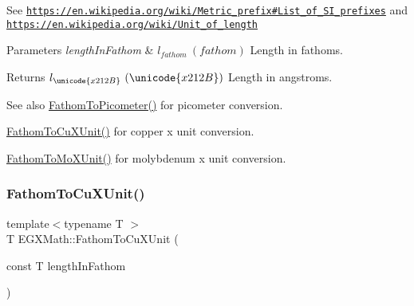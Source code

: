 See \href{https://en.wikipedia.org/wiki/Metric_prefix#List_of_SI_prefixes}{\tt https\+://en.\+wikipedia.\+org/wiki/\+Metric\+\_\+prefix\#\+List\+\_\+of\+\_\+\+S\+I\+\_\+prefixes} and \href{https://en.wikipedia.org/wiki/Unit_of_length}{\tt https\+://en.\+wikipedia.\+org/wiki/\+Unit\+\_\+of\+\_\+length} 
\begin{DoxyParams}{Parameters}
{\em length\+In\+Fathom} & $ l_{fathom}\ (fathom)$ Length in fathoms. \\
\hline
\end{DoxyParams}
\begin{DoxyReturn}{Returns}
$ l_{\unicode{x212B}}\ (\unicode{x212B})$ Length in angstroms. 
\end{DoxyReturn}
\begin{DoxySeeAlso}{See also}
\mbox{\hyperlink{group___e_g_x_math-_conversions-_length_conversions-_imperial-_fathom-_s_i_gad5fe5d3a1a48420dc43cd2826a9b6f71}{Fathom\+To\+Picometer()}} for picometer conversion. 

\mbox{\hyperlink{group___e_g_x_math-_conversions-_length_conversions-_imperial-_fathom-_non-_s_i_ga6692d3fad4af03d78145e34bf0a6c2ac}{Fathom\+To\+Cu\+X\+Unit()}} for copper x unit conversion. 

\mbox{\hyperlink{group___e_g_x_math-_conversions-_length_conversions-_imperial-_fathom-_non-_s_i_ga1e69cf778d1b7f72cd015b6cc81fc71c}{Fathom\+To\+Mo\+X\+Unit()}} for molybdenum x unit conversion. 
\end{DoxySeeAlso}
\mbox{\label{group___e_g_x_math-_conversions-_length_conversions-_imperial-_fathom-_non-_s_i_ga6692d3fad4af03d78145e34bf0a6c2ac}} 
\subsubsection{\texorpdfstring{Fathom\+To\+Cu\+X\+Unit()}{FathomToCuXUnit()}}
{\footnotesize\ttfamily template$<$typename T $>$ \\
T E\+G\+X\+Math\+::\+Fathom\+To\+Cu\+X\+Unit (\begin{DoxyParamCaption}\item[{const T}]{length\+In\+Fathom }\end{DoxyParamCaption})}



